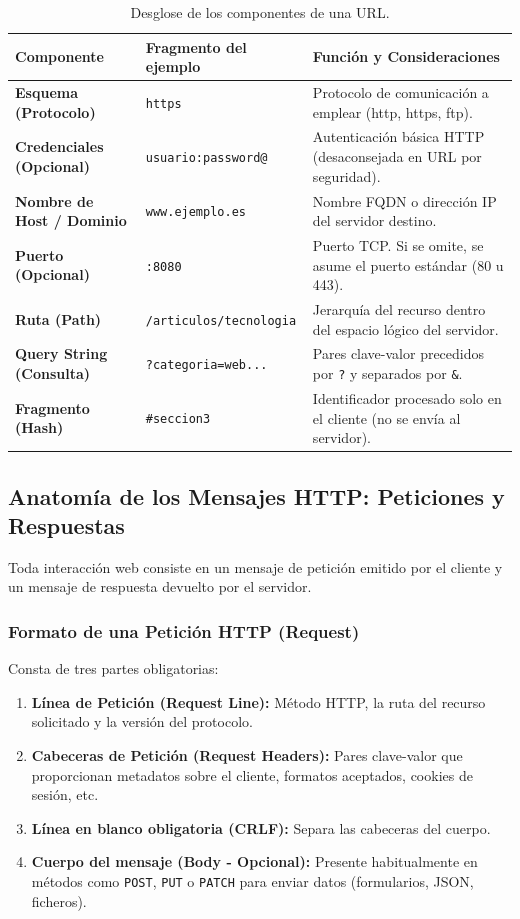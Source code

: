 \begin{table}[htbp]
\centering
\caption{Desglose de los componentes de una URL.}
\label{tab:componentes-url}
\begin{tabularx}{\textwidth}{l l X}
\toprule
\textbf{Componente} & \textbf{Fragmento del ejemplo} & \textbf{Función y Consideraciones} \\
\midrule
\textbf{Esquema (Protocolo)} & \texttt{https} & Protocolo de comunicación a emplear (http, https, ftp). \\
\textbf{Credenciales (Opcional)} & \texttt{usuario:password@} & Autenticación básica HTTP (desaconsejada en URL por seguridad). \\
\textbf{Nombre de Host / Dominio} & \texttt{www.ejemplo.es} & Nombre FQDN o dirección IP del servidor destino. \\
\textbf{Puerto (Opcional)} & \texttt{:8080} & Puerto TCP. Si se omite, se asume el puerto estándar (80 u 443). \\
\textbf{Ruta (Path)} & \texttt{/articulos/tecnologia} & Jerarquía del recurso dentro del espacio lógico del servidor. \\
\textbf{Query String (Consulta)} & \texttt{?categoria=web...} & Pares clave-valor precedidos por \texttt{?} y separados por \texttt{\&}. \\
\textbf{Fragmento (Hash)} & \texttt{\#seccion3} & Identificador procesado solo en el cliente (no se envía al servidor). \\
\bottomrule
\end{tabularx}
\end{table}

\subsection{Anatomía de los Mensajes HTTP: Peticiones y Respuestas}

Toda interacción web consiste en un mensaje de petición emitido por el cliente y un mensaje de respuesta devuelto por el servidor.

\subsubsection{Formato de una Petición HTTP (Request)}
Consta de tres partes obligatorias:
\begin{enumerate}
  \item \textbf{Línea de Petición (Request Line):} Método HTTP, la ruta del recurso solicitado y la versión del protocolo.
  \item \textbf{Cabeceras de Petición (Request Headers):} Pares clave-valor que proporcionan metadatos sobre el cliente, formatos aceptados, cookies de sesión, etc.
  \item \textbf{Línea en blanco obligatoria (CRLF):} Separa las cabeceras del cuerpo.
  \item \textbf{Cuerpo del mensaje (Body - Opcional):} Presente habitualmente en métodos como \texttt{POST}, \texttt{PUT} o \texttt{PATCH} para enviar datos (formularios, JSON, ficheros).
\end{enumerate}

